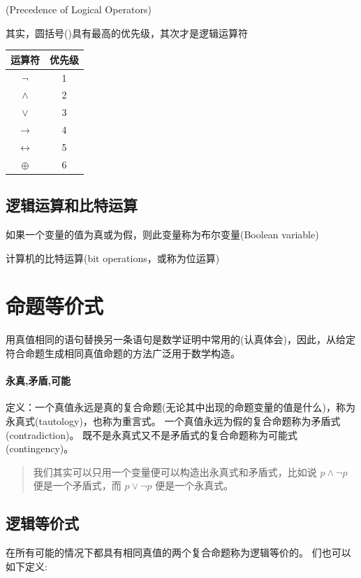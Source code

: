 \documentclass[12pt,a4paper,oneside]{ctexart}
\begin{document}
(Precedence of Logical Operators)

其实，圆括号()具有最高的优先级，其次才是逻辑运算符

\begin{tabular}{@{}cc@{}}
\hline
运算符 & 优先级 \\
\hline
\(\neg\) & 1 \\
\(\wedge\) & 2 \\
\(\vee\) & 3 \\
\(\rightarrow\) & 4 \\
\(\leftrightarrow\) & 5 \\
\(\oplus\) & 6 \\
\hline
\end{tabular}

\subsection*{逻辑运算和比特运算}

如果一个变量的值为真或为假，则此变量称为布尔变量(Boolean variable)

计算机的比特运算(bit operations，或称为位运算)

\section*{命题等价式}

用真值相同的语句替换另一条语句是数学证明中常用的(认真体会)，因此，从给定符合命题生成相同真值命题的方法广泛用于数学构造。

\paragraph*{永真,矛盾,可能}

定义：一个真值永远是真的复合命题(无论其中出现的命题变量的值是什么)，称为永真式(tautology)，也称为重言式。 一个真值永远为假的复合命题称为矛盾式(contradiction)。 既不是永真式又不是矛盾式的复合命题称为可能式(contingency)。

\begin{quote}
我们其实可以只用一个变量便可以构造出永真式和矛盾式，比如说 \(p\wedge\neg p\) 便是一个矛盾式，而 \(p\vee \neg p\) 便是一个永真式。
\end{quote}

\subsection*{逻辑等价式}

在所有可能的情况下都具有相同真值的两个复合命题称为逻辑等价的。 们也可以如下定义:
\end{document}
